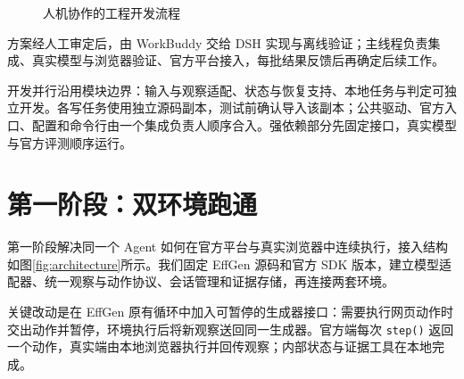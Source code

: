 \documentclass[UTF8,zihao=5,fontset=windows,a4paper]{ctexart}
\begin{document}
\begin{figure}[htbp]
\centering
{}
\caption{人机协作的工程开发流程}\label{fig:workflow}
\end{figure}
方案经人工审定后，由 WorkBuddy 交给 DSH 实现与离线验证；主线程负责集成、真实模型与浏览器验证、官方平台接入，每批结果反馈后再确定后续工作。

开发并行沿用模块边界：输入与观察适配、状态与恢复支持、本地任务与判定可独立开发。各写任务使用独立源码副本，测试前确认导入该副本；公共驱动、官方入口、配置和命令行由一个集成负责人顺序合入。强依赖部分先固定接口，真实模型与官方评测顺序运行。

\section{第一阶段：双环境跑通}
第一阶段解决同一个 Agent 如何在官方平台与真实浏览器中连续执行，接入结构如图\ref{fig:architecture}所示。我们固定 EffGen 源码和官方 SDK 版本，建立模型适配器、统一观察与动作协议、会话管理和证据存储，再连接两套环境。

关键改动是在 EffGen 原有循环中加入可暂停的生成器接口：需要执行网页动作时交出动作并暂停，环境执行后将新观察送回同一生成器。官方端每次 \texttt{step()} 返回一个动作，真实端由本地浏览器执行并回传观察；内部状态与证据工具在本地完成。
\end{document}

